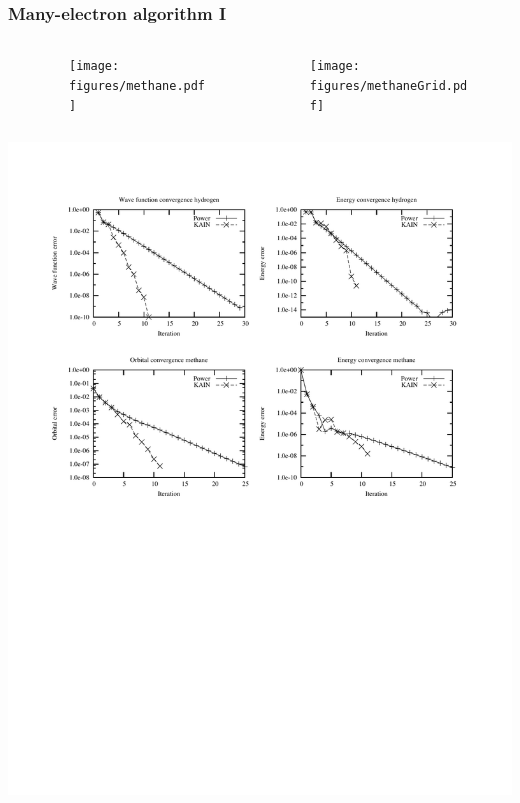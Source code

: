 \documentclass[mathserif, 10pt]{beamer}
\begin{document}
\begin{frame}
    \frametitle{Many-electron algorithm I}
    \begin{columns}
    \begin{column}[b]{0.20\linewidth}
	\vspace{5mm}
    \end{column}
    \begin{column}[b]{0.30\linewidth}
    \begin{figure}
	\centering
	\texttt{[image: figures/methane.pdf]}\\
	\vspace{5mm}
    \end{figure}
    \end{column}
    \begin{column}[b]{0.50\linewidth}
    \begin{figure}
	\begin{center}
	\texttt{[image: figures/methaneGrid.pdf]}\\
	\end{center}
    \end{figure}
    \end{column}
    \end{columns}
    \begin{center}
	\includegraphics[scale=0.6, clip, viewport = 50 350 550 540]{figures/convergence.pdf}
    \end{center}
\end{frame}
\end{document}
